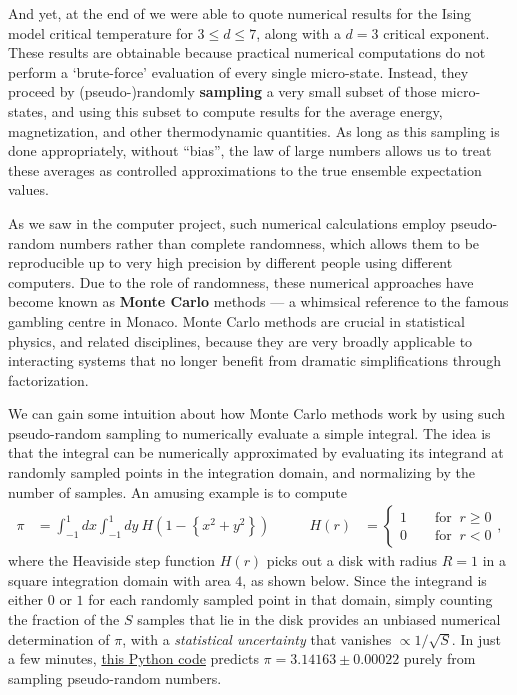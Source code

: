And yet, at the end of  we were able to quote numerical results for the Ising model critical temperature for $3 \leq d \leq 7$, along with a $d = 3$ critical exponent.
These results are obtainable because practical numerical computations do not perform a `brute-force' evaluation of every single micro-state.
Instead, they proceed by (pseudo-)randomly \textbf{sampling} a very small subset of those micro-states, and using this subset to compute results for the average energy, magnetization, and other thermodynamic quantities.
As long as this sampling is done appropriately, without ``bias'', the law of large numbers allows us to treat these averages as controlled approximations to the true ensemble expectation values.

As we saw in the computer project, such numerical calculations employ pseudo-random numbers rather than complete randomness, which allows them to be reproducible up to very high precision by different people using different computers.
Due to the role of randomness, these numerical approaches have become known as \textbf{Monte Carlo} methods --- a whimsical reference to the famous gambling centre in Monaco.
Monte Carlo methods are crucial in statistical physics, and related disciplines, because they are very broadly applicable to interacting systems that no longer benefit from dramatic simplifications through factorization.

We can gain some intuition about how Monte Carlo methods work by using such pseudo-random sampling to numerically evaluate a simple integral.
The idea is that the integral can be numerically approximated by evaluating its integrand at randomly sampled points in the integration domain, and normalizing by the number of samples.
An amusing example is to compute
\begin{align*}
  \pi & = \int_{-1}^1 dx \int_{-1}^1 dy \ H\!\left(1 - \left\{x^2 + y^2\right\}\right) \qquad &
  H(r) & = \left\{\begin{array}{l}1 \qquad \mbox{for } \ r \geq 0 \\
                                  0 \qquad \mbox{for } \ r < 0\end{array}\right. ,
\end{align*}
where the Heaviside step function $H(r)$ picks out a disk with radius $R = 1$ in a square integration domain with area $4$, as shown below.
Since the integrand is either $0$ or $1$ for each randomly sampled point in that domain, simply counting the fraction of the $S$ samples that lie in the disk provides an unbiased numerical determination of $\pi$, with a \textit{statistical uncertainty} that vanishes $\propto 1 / \sqrt{S}$.
In just a few minutes, \href{https://github.com/daschaich/MATH327_2023/blob/main/lecture_notes/unit10_pi.py}{this Python code} predicts $\pi = 3.14163 \pm 0.00022$ purely from sampling pseudo-random numbers.


